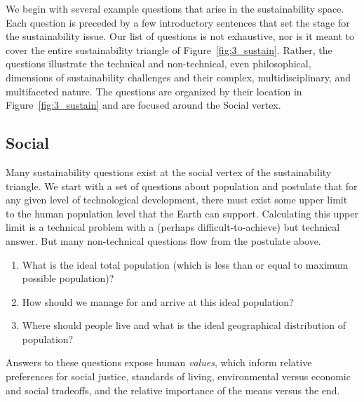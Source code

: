 \documentclass[12pt]{article}
\begin{document}
We begin with several example questions that arise in the sustainability space.
Each question is preceded by a few introductory sentences that set the stage for the 
sustainability issue.
Our list of questions is not exhaustive, nor is it meant to cover the entire sustainability triangle of 
Figure~\ref{fig:3_sustain}.
Rather, the questions illustrate the 
technical and non-technical, even philosophical, dimensions of sustainability challenges
and their
complex, multidisciplinary, and multifaceted 
nature. 
The questions are organized by their location in Figure~\ref{fig:3_sustain}
and are focused around the Social vertex.


\subsection{Social}
\label{sec:social}

Many sustainability questions exist at the social vertex of the sustainability triangle.
We start with a set of questions about population
and postulate that
for any given level of technological development, 
there must exist some upper limit to the human population level that the Earth can support. 
Calculating this upper limit is a technical problem with a 
(perhaps difficult-to-achieve)
but technical answer.  
But many non-technical questions flow from the postulate above.
%
\begin{enumerate}

  \item What is the ideal total population (which is less than or equal to maximum possible population)? 

  \item How should we manage for and arrive at this ideal population?
  
  \item Where should people live and what is the ideal geographical distribution of population?

\end{enumerate}
%
Answers to these questions expose human \emph{values}, which
inform relative preferences for 
social justice, 
standards of living, 
environmental versus economic and social tradeoffs, and 
the relative importance of the means versus the end.
\end{document}
